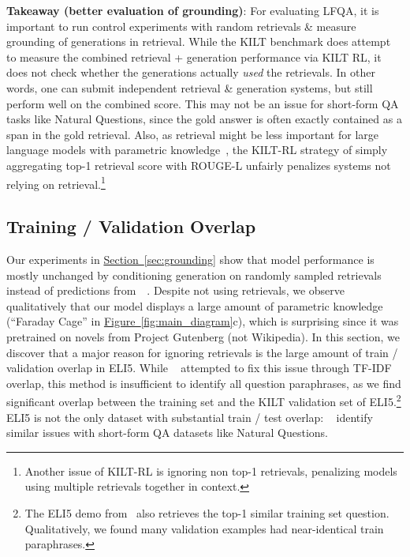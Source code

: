\documentclass[11pt]{article}
\newcommand{\namedref}[2]{\hyperref[#2]{#1~\ref*{#2}}}
\newcommand{\sectionref}[1]{\namedref{Section}{#1}}
\newcommand{\figureref}[1]{\namedref{Figure}{#1}}
\newcommand{\retriever}[1]{\textsc{c-REALM}}
\begin{document}
\noindent \textbf{Takeaway (better evaluation of grounding)}: For evaluating LFQA, it is important to run control experiments with random retrievals \& measure grounding of generations in retrieval. While the KILT benchmark does attempt to measure the combined retrieval + generation performance via KILT RL, it does not check whether the generations actually \emph{used} the retrievals. In other words, one can submit independent retrieval \& generation systems, but still perform well on the combined score. This may not be an issue for short-form QA tasks like Natural Questions, since the gold answer is often exactly contained as a span in the gold retrieval. Also, as retrieval might be less important for large language models with parametric knowledge~\citep{roberts2020much}, the KILT-RL strategy of simply aggregating top-1 retrieval score with ROUGE-L unfairly penalizes systems not relying on retrieval.\footnote{Another issue of KILT-RL is ignoring non top-1 retrievals, penalizing models using multiple retrievals together in context.}


\subsection{Training / Validation Overlap}
\label{sec:train_valid_overlap}

Our experiments in \sectionref{sec:grounding} show that model performance is mostly unchanged by 
conditioning generation on randomly sampled retrievals instead of predictions from~\retriever~. 
Despite not using retrievals, we observe qualitatively that our model displays a large amount of parametric knowledge (``Faraday Cage'' in \figureref{fig:main_diagram}c), which is surprising since 
it was pretrained on novels from Project Gutenberg (not Wikipedia). In this section, 
we discover that a major reason for ignoring retrievals is the large amount of train / validation overlap in ELI5. While ~\citet{fan-etal-2019-eli5} attempted to fix this issue through TF-IDF overlap, this method is insufficient to identify all question paraphrases, as we find significant overlap between the training set and the KILT validation set of ELI5.\footnote{The ELI5 demo from~\citet{jernite2020} also retrieves the top-1 similar training set question. Qualitatively, we found many validation examples had near-identical train paraphrases.} ELI5 is not the only dataset with substantial train / test overlap: ~\citet{lewis2020question} identify similar issues with short-form QA datasets like Natural 
Questions.\\
\end{document}

